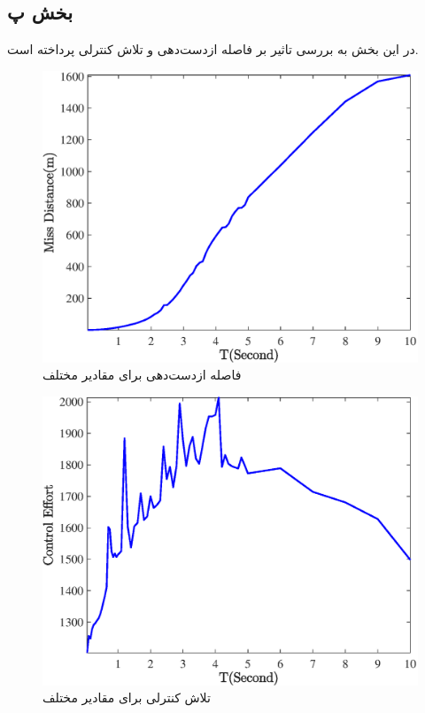 \subsection{بخش پ}
در این بخش به بررسی تاثیر
بر فاصله‌ ازدست‌دهی و تلاش کنترلی پرداخته است.
\begin{figure}[H]
	\centering
	\includegraphics[width=.75\linewidth]{../Figure/Q1/c/MD}
	\caption{فاصله ازدست‌دهی برای مقادیر مختلف }
\end{figure}

\begin{figure}[H]
	\centering
	\includegraphics[width=.75\linewidth]{../Figure/Q1/c/CE}
	\caption{تلاش کنترلی برای مقادیر مختلف }
\end{figure}